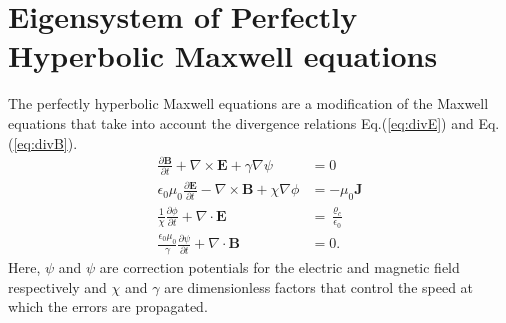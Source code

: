 \documentclass[11pt, reqno]{amsart}
\newcommand{\eqr}[1]{Eq.\thinspace(#1)}
\newcommand{\pfrac}[2]{\frac{\partial #1}{\partial #2}}
\newcommand{\mvec}[1]{\mathbf{#1}}
\theoremstyle{definition}
\begin{document}
\section{Eigensystem of Perfectly Hyperbolic Maxwell equations}

The perfectly hyperbolic Maxwell equations are a modification of the
Maxwell equations that take into account the divergence relations
\eqr{\ref{eq:divE}} and \eqr{\ref{eq:divB}}.
\begin{align}
  \frac{\partial \mvec{B}}{\partial t} + \nabla\times\mvec{E} +
  \gamma \nabla\psi
  &= 0 \\
  \epsilon_0\mu_0\frac{\partial \mvec{E}}{\partial t} -
  \nabla\times\mvec{B} +     \chi \nabla \phi
  &= -\mu_0\mvec{J} \\
  \frac{1}{\chi}\pfrac{\phi}{t} + \nabla\cdot\mvec{E} 
  &= \frac{\varrho_c}{\epsilon_0} \\
  \frac{\epsilon_0\mu_0}{\gamma}\pfrac{\psi}{t} + \nabla\cdot\mvec{B} 
  &= 0.
\end{align}
Here, $\psi$ and $\psi$ are correction potentials for the electric and
magnetic field respectively and $\chi$ and $\gamma$ are dimensionless
factors that control the speed at which the errors are
propagated.
\end{document}
